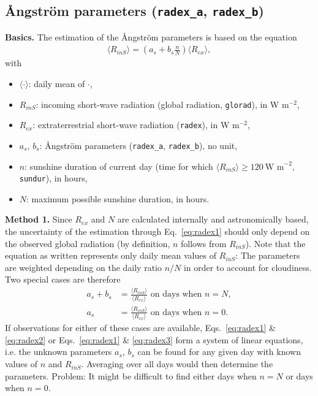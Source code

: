 \documentclass{scrreprt}
\newenvironment{denseitem}{
  \begin{itemize}
    \setlength{\itemsep}{0pt}
    \setlength{\parskip}{0pt}
    \setlength{\parsep}{0pt}
}{
  \end{itemize}
}
\begin{document}
\newpage
\subsection{{\AA}ngstr\"om parameters (\texttt{radex\_a}, \texttt{radex\_b})} \label{ssec:parest_rad_radex}

\textbf{Basics.}
The estimation of the {\AA}ngstr\"om parameters is based on the equation
\begin{align} \label{eq:radex1}
  \langle R_{inS} \rangle = \left (  a_s + b_s \frac{n}{N} \right ) \langle R_{ex} \rangle,
\end{align}
%
with
\begin{denseitem}
  \item[] $\langle \cdot \rangle$: daily mean of $\cdot$,
  \item[] $R_{inS}$: incoming short-wave radiation (global radiation, \verb!glorad!), in W m$^{-2}$,
  \item[] $R_{ex}$: extraterrestrial short-wave radiation (\verb!radex!), in W m$^{-2}$,
  \item[] $a_s$, $b_s$: {\AA}ngstr\"om parameters (\verb!radex_a!, \verb!radex_b!), no unit,
  \item[] $n$: sunshine duration of current day (time for which $\langle R_{inS} \rangle \geq 120~\text{W~m}^{-2}$, \verb!sundur!), in hours,
  \item[] $N$: maximum possible sunshine duration, in hours.
\end{denseitem}

\noindent
\textbf{Method 1.}
Since $R_{ex}$ and $N$ are calculated internally and astronomically based, the uncertainty of the estimation through Eq.~\eqref{eq:radex1} should only depend on the observed global radiation (by definition, $n$ follows from $R_{inS}$).
Note that the equation as written represents only daily mean values of $R_{inS}$:
The parameters are weighted depending on the daily ratio $n/N$ in order to account for cloudiness.
Two special cases are therefore
\begin{align}
  a_s + b_s &= \frac{\langle R_{inS} \rangle}{\langle R_{ex} \rangle} \text{ on days when } n=N, \label{eq:radex2} \\
  a_s &= \frac{\langle R_{inS} \rangle}{\langle R_{ex} \rangle} \text{ on days when } n=0. \label{eq:radex3}
\end{align}
%
If observations for either of these cases are available, Eqs.~\eqref{eq:radex1} \& \eqref{eq:radex2} or Eqs.~\eqref{eq:radex1} \& \eqref{eq:radex3} form a system of linear equations, i.e. the unknown parameters $a_s$, $b_s$ can be found for any given day with known values of $n$ and $R_{inS}$.
Averaging over all days would then determine the parameters.
Problem: It might be difficult to find either days when $n=N$ or days when $n=0$.
\end{document}

